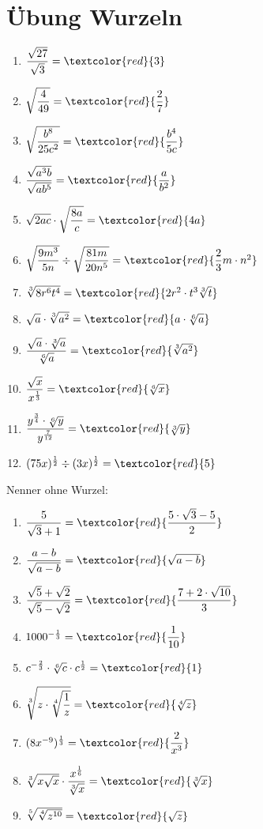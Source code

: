 \documentclass[11pt, a4paper, twoside, fleqn]{article}
\begin{document}
\newpage

\section{Übung Wurzeln}
\begin{enumerate} [itemsep=3ex]
\item $ \dfrac{\sqrt{27}}{\sqrt{3}} = \textcolor{red}{3} $
\item $ \sqrt{\dfrac{4}{49}} = \textcolor{red}{\dfrac{2}{7}} $
\item $ \sqrt{\dfrac{b^{8}}{25c^{2}}} = \textcolor{red}{\dfrac{b^{4}}{5c}} $
\item $ \dfrac{\sqrt{a^{3}b}}{\sqrt{ab^{5}}} = \textcolor{red}{\dfrac{a}{b^{2}}} $
\item $ \sqrt{2ac} \cdot \sqrt{\dfrac{8a}{c}} = \textcolor{red}{4a} $
\item $ \sqrt{\dfrac{9m^{3}}{5n}} \div \sqrt{\dfrac{81m}{20n^{5}}} = \textcolor{red}{\dfrac{2}{3} m \cdot n^{2}} $
\item $ \sqrt[3]{8r^{6}t^{4}} = \textcolor{red}{2r^{2} \cdot t^{3} \sqrt[3]{t}} $
\item $\sqrt{a} \cdot \sqrt[3]{a^{2}} = \textcolor{red}{ a \cdot \sqrt[6]{a}}$
\item $ \dfrac{\sqrt{a} \cdot \sqrt[3]{a}}{\sqrt[6]{a}} = \textcolor{red}{\sqrt[3]{a^{2}}} $
\item $ \dfrac{\sqrt{x}}{x^{\frac{1}{3}}} = \textcolor{red}{\sqrt[6]{x}} $
\item $ \dfrac{y^{\frac{3}{4}} \cdot \sqrt[6]{y}}{y^{\frac{7}{12}}} = \textcolor{red}{\sqrt[3]{y}} $
\item $ (75x)^{\frac{1}{2}} \div (3x)^{\frac{1}{2}} = \textcolor{red}{5} $
\end{enumerate}

Nenner ohne Wurzel:

\begin{enumerate} [itemsep=3ex]\addtocounter{enumi}{12}
\item $ \dfrac{5}{\sqrt{3} + 1} = \textcolor{red}{\dfrac{5 \cdot \sqrt{3} - 5}{2}} $
\item $ \dfrac{a - b}{\sqrt{a - b}} = \textcolor{red}{\sqrt{a - b}} $
\item $ \dfrac{\sqrt{5} + \sqrt{2}}{\sqrt{5} - \sqrt{2}} = \textcolor{red}{\dfrac{7 +2 \cdot \sqrt{10}}{3}} $
\item $ 1000^{- \frac{1}{3}} = \textcolor{red}{\dfrac{1}{10}} $
\item $ c^{- \frac{2}{3}} \cdot \sqrt[6]{c} \cdot c^{\frac{1}{2}} = \textcolor{red}{1} $
\item $ \sqrt[3]{z \cdot \sqrt[4]{\dfrac{1}{z}}} = \textcolor{red}{\sqrt[4]{z}} $
\item $ (8x^{-9})^{\frac{1}{3}} = \textcolor{red}{\dfrac{2}{x^{3}}} $
\item $ \sqrt[3]{x\sqrt{x}} \cdot \dfrac{x^{\frac{1}{6}}}{\sqrt[3]{x}} = \textcolor{red}{\sqrt[3]{x}} $
\item $ \sqrt[5]{\sqrt[4]{z^{10}}}= \textcolor{red}{\sqrt{z}} $
\end{enumerate}
\end{document}
